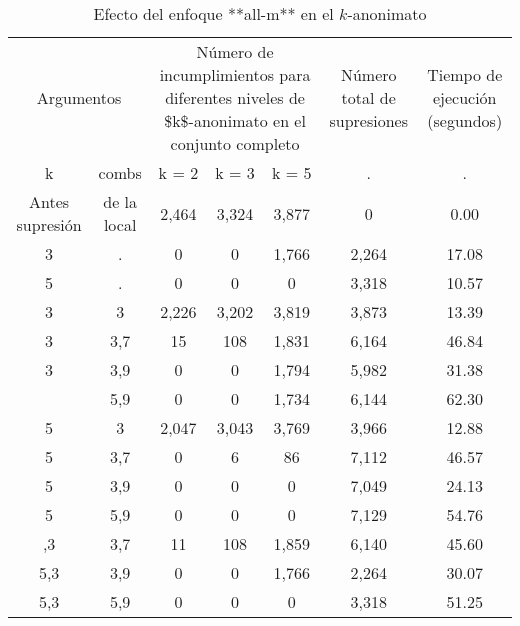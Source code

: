 \documentclass[
]{book}
\theoremstyle{definition}
\theoremstyle{definition}
\theoremstyle{definition}
\theoremstyle{definition}
\theoremstyle{remark}
\begin{document}
\begin{table}

\caption{\label{tab:Tabla11}\label{tab:Tabla11}Efecto del enfoque **all-m** en el $k$-anonimato}
\centering
\begin{tabular}[t]{ccccccc}
\toprule
\multicolumn{2}{c}{Argumentos} & \multicolumn{3}{c}{Número de incumplimientos para diferentes niveles de \$k\$-anonimato en el conjunto completo} & \multicolumn{1}{c}{Número total de supresiones} & \multicolumn{1}{c}{Tiempo de ejecución (segundos)} \\
\cmidrule(l{3pt}r{3pt}){1-2} \cmidrule(l{3pt}r{3pt}){3-5} \cmidrule(l{3pt}r{3pt}){6-6} \cmidrule(l{3pt}r{3pt}){7-7}
\multicolumn{1}{c}{k} & \multicolumn{1}{c}{combs} & \multicolumn{1}{c}{k = 2} & \multicolumn{1}{c}{k = 3} & \multicolumn{1}{c}{k = 5} & \multicolumn{1}{c}{.} & \multicolumn{1}{c}{.} \\
\cmidrule(l{3pt}r{3pt}){1-1} \cmidrule(l{3pt}r{3pt}){2-2} \cmidrule(l{3pt}r{3pt}){3-3} \cmidrule(l{3pt}r{3pt}){4-4} \cmidrule(l{3pt}r{3pt}){5-5} \cmidrule(l{3pt}r{3pt}){6-6} \cmidrule(l{3pt}r{3pt}){7-7}
Antes supresión & de la local & 2,464 & 3,324 & 3,877 & 0 & 0.00\\
\midrule
3 & . & 0 & 0 & 1,766 & 2,264 & 17.08\\
5 & . & 0 & 0 & 0 & 3,318 & 10.57\\
3 & 3 & 2,226 & 3,202 & 3,819 & 3,873 & 13.39\\
3 & 3,7 & 15 & 108 & 1,831 & 6,164 & 46.84\\
3 & 3,9 & 0 & 0 & 1,794 & 5,982 & 31.38\\
\addlinespace
3 & 5,9 & 0 & 0 & 1,734 & 6,144 & 62.30\\
5 & 3 & 2,047 & 3,043 & 3,769 & 3,966 & 12.88\\
5 & 3,7 & 0 & 6 & 86 & 7,112 & 46.57\\
5 & 3,9 & 0 & 0 & 0 & 7,049 & 24.13\\
5 & 5,9 & 0 & 0 & 0 & 7,129 & 54.76\\
\addlinespace
5,3 & 3,7 & 11 & 108 & 1,859 & 6,140 & 45.60\\
5,3 & 3,9 & 0 & 0 & 1,766 & 2,264 & 30.07\\
5,3 & 5,9 & 0 & 0 & 0 & 3,318 & 51.25\\
\bottomrule
\end{tabular}
\end{table}
\end{document}
